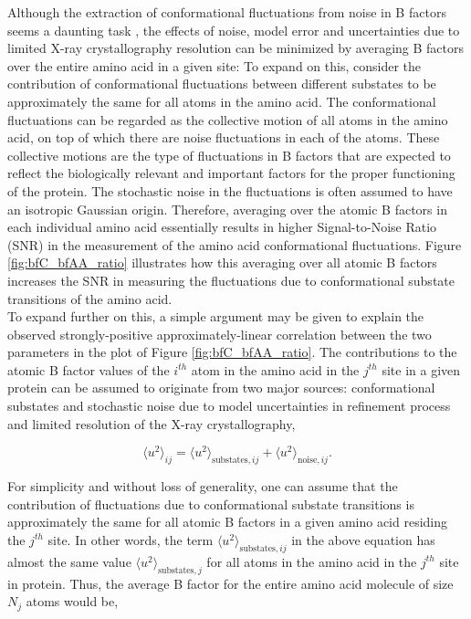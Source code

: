 \documentclass[11pt]{article}
\begin{document}
    Although the extraction of conformational fluctuations from noise in B factors seems a daunting task \cite{read_structure-factor_1990}, the effects of noise, model error and uncertainties due to limited X-ray crystallography resolution can be minimized by averaging B factors over the entire amino acid in a given site: To expand on this, consider the contribution of conformational fluctuations between different substates to be approximately the same for all atoms in the amino acid. The conformational fluctuations can be regarded as the collective motion of all atoms in the amino acid, on top of which there are noise fluctuations in each of the atoms. These collective motions are the type of fluctuations in B factors that are expected to reflect the biologically relevant and important factors for the proper functioning of the protein. The stochastic noise in the fluctuations is often assumed to have an isotropic Gaussian origin. Therefore, averaging over the atomic B factors in each individual amino acid essentially results in higher Signal-to-Noise Ratio (SNR) in the measurement of the amino acid conformational fluctuations. Figure \ref{fig:bfC_bfAA_ratio} illustrates how this averaging over all atomic B factors increases the SNR in measuring the fluctuations due to conformational substate transitions of the amino acid. \\


    To expand further on this, a simple argument may be given to explain the observed strongly-positive approximately-linear correlation between the two parameters in the plot of Figure \ref{fig:bfC_bfAA_ratio}. The contributions to the atomic B factor values of the $i^{th}$ atom in the amino acid in the $j^{th}$ site in a given protein can be assumed to originate from two major sources: conformational substates and stochastic noise due to model uncertainties in refinement process and limited resolution of the X-ray crystallography,

    \begin{equation}
        \label{eqn:bf_comp}
        \langle u^2 \rangle_{ij} = \langle u^2 \rangle_{\text{substates},ij} + \langle u^2 \rangle_{\text{noise},ij}.
    \end {equation}

    For simplicity and without loss of generality, one can assume that the contribution of fluctuations due to conformational substate transitions is approximately the same for all atomic B factors in a given amino acid residing the $j^{th}$ site. In other words, the term $\langle u^2 \rangle_{\text{substates},ij}$ in the above equation has almost the same value $\langle u^2 \rangle_{\text{substates},j}$ for all atoms in the amino acid in the $j^{th}$ site in protein. Thus, the average B factor for the entire amino acid molecule of size $N_j$ atoms would be,
\end{document}
